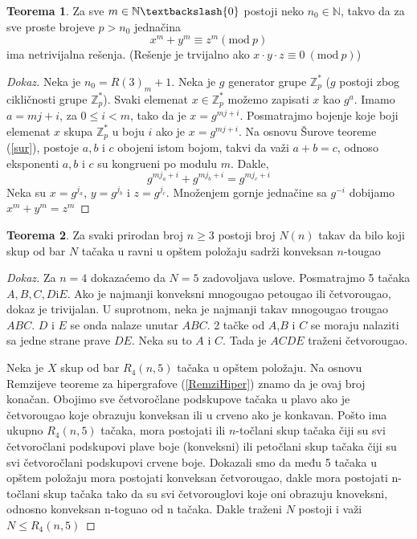 \documentclass{article}
\theoremstyle{definition}
\newtheorem{teorema}{Teorema}[section]
\newcommand{\dokaz}[1]{\begin{proof}[Dokaz]#1\end{proof}}
\begin{document}
		\begin{teorema} \label{sur2}
			 Za sve $m \in \mathbb{N} \textbackslash \{0\}$ postoji neko $n_{0} \in \mathbb{N}$, takvo da za sve proste brojeve $p>n_{0}$ jednačina
			\[
			x^{m}+y^{m}\equiv z^{m} (\mathrm{mod} \: p) 
			\]
			ima netrivijalna rešenja. (Rešenje je trvijalno ako $x\cdot y \cdot z\equiv 0\: (\mathrm{mod} \: p)$)
		\end{teorema}
		\dokaz{
			Neka je $n_0=R(3)_m+1$. Neka je $g$ generator grupe $\mathbb{Z}_{p}^{*} $ ($g$ postoji zbog cikličnosti grupe $\mathbb{Z}_{p}^{*}$). Svaki elemenat $x\in\mathbb{Z}_{p}^{*}$ možemo zapisati $x$ kao $g^a$. Imamo $a=mj+i$, za $0\leq i < m$, tako da je $x=g^{mj+i}$. Posmatrajmo bojenje koje boji elemenat $x$ skupa $\mathbb{Z}_{p}^{*}$ u boju $i$ ako je $x=g^{mj+i}$. Na osnovu Šurove teoreme (\ref{sur}), postoje $a, b$ i $c$ obojeni istom bojom, takvi da važi $a+b=c$, odnoso eksponenti $a, b$ i $c$ su kongrueni po modulu $m$. Dakle,
			\[
				g^{mj_{a}+i}+g^{mj_{b}+i}=g^{mj_{c}+i}
			\]
			Neka su $x=g^{j_{a}}$, $y=g^{j_{b}}$ i $z=g^{j_{c}}$. Množenjem gornje jednačine sa $g^{-i}$ dobijamo $x^m+y^m=z^m$  
		}
		\begin{teorema}
			Za svaki prirodan broj $n\geq 3$ postoji broj $N(n)$ takav da bilo koji skup od bar $N$ tačaka u ravni u opštem položaju sadrži konveksan $n$-tougao
		\end{teorema}
		\dokaz{
			Za $n=4$ dokazaćemo da $N=5$ zadovoljava uslove. Posmatrajmo 5 tačaka $A,B,C,D \mathrm{i} E$. Ako je najmanji konveksni mnogougao petougao ili četvorougao, dokaz je trivijalan. U suprotnom, neka je najmanji takav mnogougao trougao $ABC$. $D$ i $E$ se onda nalaze unutar $ABC$. 2 tačke od $A$,$B$ i $C$ se moraju nalaziti sa jedne strane prave $DE$. Neka su to $A$ i $C$. Tada je $ACDE$ traženi četvorougao.

			Neka je $X$ skup od bar $R_4(n,5)$ tačaka u opštem položaju. Na osnovu Remzijeve teoreme za hipergrafove (\ref{RemziHiper}) znamo da je ovaj broj konačan. Obojimo sve četvoročlane podskupove tačaka u plavo ako je četvorougao koje obrazuju konveksan ili u crveno ako je konkavan. Pošto ima ukupno $R_{4}(n,5)$ tačaka, mora postojati ili $n$-točlani skup tačaka čiji su svi četvoročlani podskupovi plave boje (konveksni) ili petočlani skup tačaka čiji su svi četvoročlani podskupovi crvene boje. Dokazali smo da među 5 tačaka u opštem položaju mora postojati konveksan četvorougao, dakle mora postojati n-točlani skup tačaka tako da su svi četvorouglovi koje oni obrazuju knoveksni, odnosno konveksan n-toguao od n tačaka. Dakle traženi $N$ postoji i važi $N\leq R_{4}(n,5)$

		}
\end{document}
